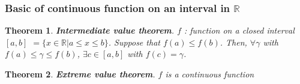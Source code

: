 \documentclass[a4paper,10pt]{article}
\newtheorem{theo}{Theorem}
\begin{document}
\subsubsection{Basic of continuous function on an interval in $ \mathbb{R} $}

\begin{theo}
	\textbf{Intermediate value theorem}. $ f $ : function on a closed interval $ [a,b] $ $ = \{ x \in \mathbb{R} | a \leq x \leq b \} $. Suppose that $ f(a) \leq f(b) $. Then, $ \forall \gamma $ with $ f(a) \leq \gamma \leq f(b) $, $ \exists c \in [a,b] $ with $ f(c)=\gamma $.
\end{theo}

\begin{theo}
	\textbf{Extreme value theorem}. $ f $ is a continuous function
\end{theo}
\end{document}
